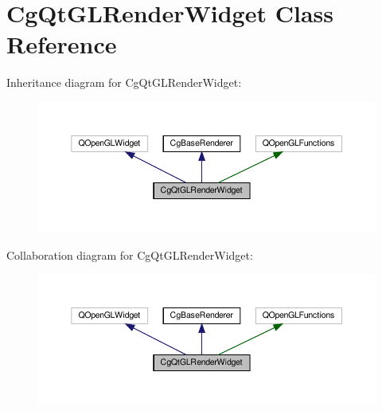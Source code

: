 \hypertarget{class_cg_qt_g_l_render_widget}{}\section{Cg\+Qt\+G\+L\+Render\+Widget Class Reference}
\label{class_cg_qt_g_l_render_widget}


Inheritance diagram for Cg\+Qt\+G\+L\+Render\+Widget\+:
\nopagebreak
\begin{figure}[H]
\begin{center}
\leavevmode
\includegraphics[width=350pt]{class_cg_qt_g_l_render_widget__inherit__graph}
\end{center}
\end{figure}


Collaboration diagram for Cg\+Qt\+G\+L\+Render\+Widget\+:
\nopagebreak
\begin{figure}[H]
\begin{center}
\leavevmode
\includegraphics[width=350pt]{class_cg_qt_g_l_render_widget__coll__graph}
\end{center}
\end{figure}
